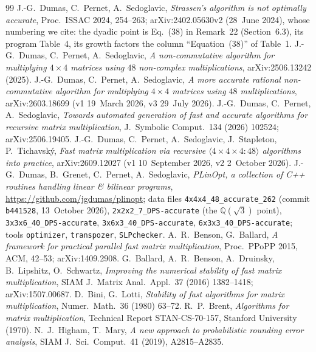 \documentclass[11pt]{article}
\begin{document}
{\small
\begin{thebibliography}{99}
 J.-G.~Dumas, C.~Pernet, A.~Sedoglavic, \emph{Strassen's
algorithm is not optimally accurate}, Proc.\ ISSAC 2024, 254--263;
arXiv:2402.05630v2 (28~June 2024), whose numbering we cite: the dyadic
point is Eq.~(38) in Remark~22 (Section~6.3), its program Table~4, its
growth factors the column ``Equation~(38)'' of Table~1.
 J.-G.~Dumas, C.~Pernet, A.~Sedoglavic, \emph{A
non-commutative algorithm for multiplying $4\times4$ matrices using
$48$ non-complex multiplications}, arXiv:2506.13242 (2025).
 J.-G.~Dumas, C.~Pernet, A.~Sedoglavic, \emph{A more
accurate rational non-commutative algorithm for multiplying $4\times4$
matrices using $48$ multiplications}, arXiv:2603.18699 (v1 19~March
2026, v3 29~July 2026).
 J.-G.~Dumas, C.~Pernet, A.~Sedoglavic, \emph{Towards
automated generation of fast and accurate algorithms for recursive
matrix multiplication}, J.\ Symbolic Comput.\ 134 (2026) 102524;
arXiv:2506.19405.
 J.-G.~Dumas, C.~Pernet, A.~Sedoglavic, J.~Stapleton,
P.~Tichavsk\'y, \emph{Fast matrix multiplication via recursive
$\langle4\times4\times4:48\rangle$ algorithms into practice},
arXiv:2609.12027 (v1 10~September 2026, v2 2~October 2026).
 J.-G.~Dumas, B.~Grenet, C.~Pernet, A.~Sedoglavic,
\emph{PLinOpt, a collection of C++ routines handling linear \&
bilinear programs}, \url{https://github.com/jgdumas/plinopt}; data
files \texttt{4x4x4\_48\_accurate\_262} (commit \texttt{b441528},
13~October 2026), \texttt{2x2x2\_7\_DPS-accurate} (the $\mathbb{Q}(\sqrt3)$ point), \texttt{3x3x6\_40\_DPS-accurate}, \texttt{3x6x3\_40\_DPS-accurate},
\texttt{6x3x3\_40\_DPS-accurate}; tools \texttt{optimizer}, \texttt{transpozer},
\texttt{SLPchecker}.
 A.~R.~Benson, G.~Ballard, \emph{A framework for practical
parallel fast matrix multiplication}, Proc.\ PPoPP 2015, ACM, 42--53;
arXiv:1409.2908.
 G.~Ballard, A.~R.~Benson, A.~Druinsky, B.~Lipshitz,
O.~Schwartz, \emph{Improving the numerical stability of fast matrix
multiplication}, SIAM J.\ Matrix Anal.\ Appl.\ 37 (2016) 1382--1418;
arXiv:1507.00687.
 D.~Bini, G.~Lotti, \emph{Stability of fast algorithms for
matrix multiplication}, Numer.\ Math.\ 36 (1980) 63--72.
 R.~P.~Brent, \emph{Algorithms for matrix
multiplication}, Technical Report STAN-CS-70-157, Stanford University
(1970).
 N.~J.~Higham, T.~Mary, \emph{A new approach to probabilistic
rounding error analysis}, SIAM J.\ Sci.\ Comput.\ 41 (2019), A2815--A2835.

\end{thebibliography}}
\end{document}
